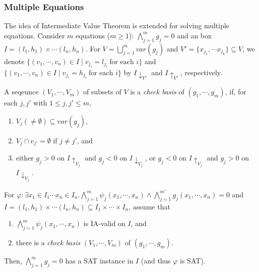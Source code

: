 \documentclass[runningheads,a4paper,oribibl]{llncs}
\newcommand{\suppress}[1]{} %
\begin{document}
\subsubsection{Multiple Equations}
The idea of Intermediate Value Theorem is extended for solving multiple equations. 
Consider $m$ equations ($m \ge 1$): $\bigwedge \limits_{j=1}^m g_j = 0$ and 
an box $I = {(l_1, h_1) \times \cdots (l_n, h_n)}$.
For $V = \bigcup \limits_{j=1}^m var(g_j)$ and $V' = \{x_{j_1}, \cdots x_{j_k} \} \subseteq V$,
we denote $\{ (v_1, \cdots, v_n) \in I \mid v_{j_i} = l_{j_i}~\text{for each $i$} \}$
and $\{ (v_1, \cdots, v_n) \in I \mid v_{j_i} = h_{j_i}~\text{for each $i$} \}$
by $I\downarrow_{V'}$ and $I\uparrow_{V'}$, respectively. 

\begin{definition} \label{def:CheckBasis} 
A seqeunce $(V_1, \cdots, V_m)$ of subsets of $V$ is a {\em check basis} of $(g_1, \cdots, g_m)$,
if, for each $j,j'$ with $1 \leq j, j' \leq m$, 
\begin{enumerate}
\item $V_j (\neq \emptyset) \subseteq var(g_j)$, 
\item $V_j \cap v_{j'} = \emptyset$ if $j \neq j'$, and 
\item either $g_j > 0$ on $I\uparrow_{V_j}$ and $g_j < 0$ on $I\downarrow_{V_j}$, or
      $g_j < 0$ on $I\uparrow_{V_j}$ and $g_j > 0$ on $I\downarrow_{V_j}$. 
\end{enumerate}
\end{definition} 
\suppress{
For all $j\in \{1, \cdots, m\}$, let $k_j = |V_j|$ and
${V_j = \{v_{jk} \mid 1 \le k \le k_j \}}$, then, there exist two combinations
${(x_{j1}, \cdots, x_{jk_j}) = (t_{j1}, \cdots, t_{jk_j})}$ and
${(x_{j1}, \cdots, x_{jk_j}) = (t'_{j1}, \cdots, t'_{jk_j})}$
where $t_{jk} \neq t'_{jk} \in (l_{jk}, h_{jk})$, $1 \le k \le k_j$ such that
\[g_j(t_{j1}, \cdots, t_{jk_j}, \cdots, x_{jk}, \cdots) > 0\] and
\[g_j(t'_{j1}, \cdots, t'_{jk_j}, \cdots, x_{jk}, \cdots) < 0\]
for all values of $x_{jk}$ in $(l_{jk}, h_{jk})$ where $x_{jk} \in var(g_j) \setminus V_j$.
We denote $ivt(g_j, V_j, I)$ to represent that the polynomial $g_j$ enjoy this property
with respect to $V_j$ and $I$.
} %

\begin{lemma} \label{lem:multieq}
For $\varphi: \exists x_1 \in I_1 \cdots x_n \in I_n.
\bigwedge \limits_{j=1}^m \psi_j(x_1,\cdots,x_n) \wedge
\bigwedge \limits_{j=1}^{m'} g_j(x_1,\cdots,x_n) = 0$
and $I = {(l_1, h_1) \times \cdots (l_n, h_n)} \subseteq I_1 \times \cdots \times I_n$, 
assume that
\begin{enumerate}
\item $\bigwedge \limits_{j=1}^m \psi_j(x_1,\cdots,x_n)$ is IA-valid on $I$, and
\item there is a {\em check basis} $(V_1, \cdots, V_m)$ of $(g_1, \cdots, g_m)$. 
\end{enumerate}
Then, $\bigwedge \limits_{j=1}^m g_j = 0$ has a SAT instance in $I$
(and thus $\varphi$ is SAT). 
\end{lemma}
\end{document}
